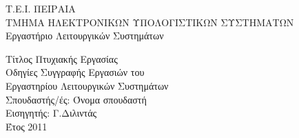 \thispagestyle{empty}

\begin{center}
Τ.Ε.Ι. ΠΕΙΡΑΙΑ\\
ΤΜΗΜΑ ΗΛΕΚΤΡΟΝΙΚΩΝ ΥΠΟΛΟΓΙΣΤΙΚΩΝ ΣΥΣΤΗΜΑΤΩΝ\\
Εργαστήριο Λειτουργικών Συστημάτων\\
\vspace{6\baselineskip}

\Huge
Τίτλος Πτυχιακής Εργασίας\\
\Large
Οδηγίες Συγγραφής Εργασιών του\\
Εργαστηρίου Λειτουργικών Συστημάτων\\
\vspace{1.5\baselineskip}
Σπουδαστής/ές: Όνομα σπουδαστή\\
Εισηγητής: Γ.Διλιντάς\\
Έτος 2011\\
\vspace{0.5\baselineskip}
\end{center}
